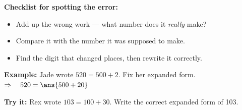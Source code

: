 \documentclass[12pt]{article}
\begin{document}

\begin{formulabox}
\textbf{Checklist for spotting the error:}
\begin{itemize}[leftmargin=1.2cm, itemsep=1pt, topsep=2pt]
  \item Add up the wrong work --- what number does it \emph{really} make?
  \item Compare it with the number it was supposed to make.
  \item Find the digit that changed places, then rewrite it correctly.
\end{itemize}
\end{formulabox}

\begin{examplebox}
\textbf{Example:} \quad Jade wrote $520 = 500 + 2$. Fix her expanded form.
$\Rightarrow\quad 520 = \ans{500 + 20}$
\end{examplebox}

\begin{tryitbox}
\textbf{Try it:} \quad Rex wrote $103 = 100 + 30$. Write the correct
expanded form of 103.\\[2pt]
\end{tryitbox}
\end{document}
